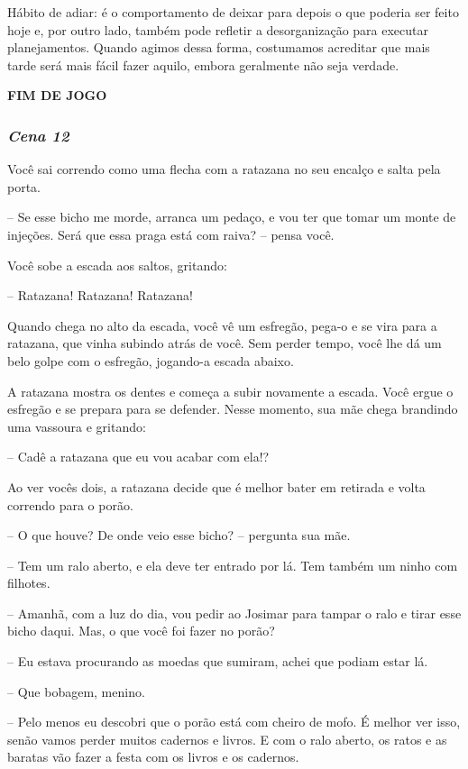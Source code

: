 Hábito de adiar: é o comportamento de deixar para depois o que poderia ser feito hoje e, por outro lado, também pode refletir a desorganização para executar planejamentos. Quando agimos dessa forma, costumamos acreditar que mais tarde será mais fácil fazer aquilo, embora geralmente não seja verdade.

\textbf{FIM DE JOGO}

\bigskip\medskip

\subsubsection*{\textit{\textbf{Cena 12}}}
Você sai correndo como uma flecha com a ratazana no seu encalço e salta pela porta.

-- Se esse bicho me morde, arranca um pedaço, e vou ter que tomar um monte de injeções. Será que essa praga está com raiva? -- pensa você.

Você sobe a escada aos saltos, gritando:

-- Ratazana! Ratazana! Ratazana!

Quando chega no alto da escada, você vê um esfregão, pega-o e se vira para a ratazana, que vinha subindo atrás de você. Sem perder tempo, você lhe dá um belo golpe com o esfregão, jogando-a escada abaixo.

A ratazana mostra os dentes e começa a subir novamente a escada. Você ergue o esfregão e se prepara para se defender. Nesse momento, sua mãe chega brandindo uma vassoura e gritando:

-- Cadê a ratazana que eu vou acabar com ela!?

Ao ver vocês dois, a ratazana decide que é melhor bater em retirada e volta correndo para o porão.

-- O que houve? De onde veio esse bicho? -- pergunta sua mãe.

-- Tem um ralo aberto, e ela deve ter entrado por lá. Tem também um ninho com filhotes.

-- Amanhã, com a luz do dia, vou pedir ao Josimar para tampar o ralo e tirar esse bicho daqui. Mas, o que você foi fazer no porão?

-- Eu estava procurando as moedas que sumiram, achei que podiam estar lá.

-- Que bobagem, menino.

-- Pelo menos eu descobri que o porão está com cheiro de mofo.
É melhor ver isso, senão vamos perder muitos cadernos e livros. E com o ralo aberto, os ratos e as baratas vão fazer a festa com os livros e os cadernos.

